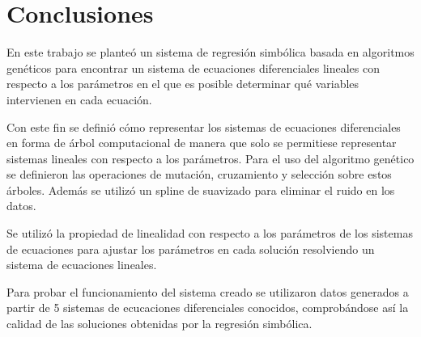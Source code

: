 \chapter*{Conclusiones}\label{chapter:conclusions}

En este trabajo se planteó un sistema de regresión simbólica basada en algoritmos genéticos para encontrar un sistema de ecuaciones diferenciales lineales con respecto a los parámetros en el que es posible determinar qué variables intervienen en cada ecuación.

Con este fin se definió cómo representar los sistemas de ecuaciones diferenciales en forma de árbol computacional de manera que solo se permitiese representar sistemas lineales con respecto a los parámetros. Para el uso del algoritmo genético se definieron las operaciones de mutación, cruzamiento y selección sobre estos árboles. Además se utilizó un spline de suavizado para eliminar el ruido en los datos.

Se utilizó la propiedad de linealidad con respecto a los parámetros de los sistemas de ecuaciones para ajustar los parámetros en cada solución resolviendo un sistema de ecuaciones lineales.

Para probar el funcionamiento del sistema creado se utilizaron datos generados a partir de 5 sistemas de ecucaciones diferenciales conocidos, comprobándose así la calidad de las soluciones obtenidas por la regresión simbólica.